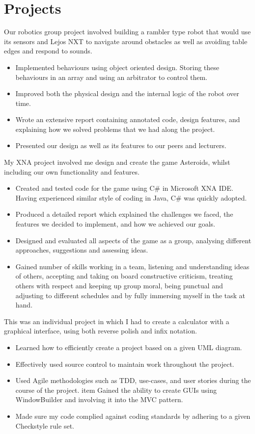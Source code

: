 \documentclass[10pt,a4paper]{moderncv}
\begin{document}
\section{Projects}
{
Our robotics group project involved building a rambler type robot that would use its sensors and Lejos NXT to navigate around obstacles as well as avoiding table edges and respond to sounds.
\begin{itemize}
  \item Implemented behaviours using object oriented design. Storing these behaviours in an array and using an arbitrator to control them.
  \item Improved both the physical design and the internal logic of the robot over time.
  \item Wrote an extensive report containing annotated code, design features, and explaining how we solved problems that we had along the project.
  \item Presented our design as well as its features to our peers and lecturers.
\end{itemize}
}
{
My XNA project involved me design and create the game Asteroids, whilst including our own functionality and features.
\begin{itemize}
	\item Created and tested code for the game using C\# in Microsoft XNA IDE. Having experienced similar style of coding in Java, C\# was quickly adopted.
	\item Produced a detailed report which explained the challenges we faced, the features we decided to implement, and how we achieved our goals.
	\item Designed and evaluated all aspects of the game as a group, analysing different approaches, suggestions and assessing ideas.
	\item Gained number of skills working in a team, listening and understanding ideas of others, accepting and taking on board constructive criticism, treating others with respect and keeping up group moral, being punctual and adjusting to different schedules and by fully immersing myself in the task at hand.
\end{itemize}
}
{
This was an individual project in which I had to create a calculator with a graphical interface, using both reverse polish and infix notation.
\begin{itemize}
	\item Learned how to efficiently create a project based on a given UML diagram.
	\item Effectively used source control to maintain work throughout the project.
	\item Used Agile methodologies such as TDD, use-cases, and user stories during the course of the project.
	item Gained the ability to create GUIs using WindowBuilder and involving it into the MVC pattern.
	\item Made sure my code complied against coding standards by adhering to a given Checkstyle rule set.
\end{itemize}
}
\end{document}
